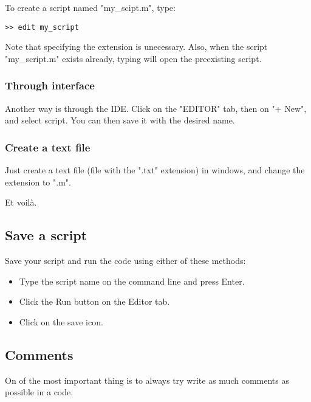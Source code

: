 			To create a script named "my\_scipt.m", type:
\begin{lstlisting}
>> edit my_script
\end{lstlisting}
			Note that specifying the extension is unecessary.
			Also, when the script "my\_script.m" exists already, typing  will open the preexisting script.		
		\subsubsection{Through \matlab interface}
			Another way is through the IDE.
			Click on the "EDITOR" tab, then on "+ New", and select script.
			You can then save it with the desired name.

		\subsubsection{Create a text file}
			Just create a text file (file with the ".txt" extension) in windows, and change the extension to ".m".

		Et voilà.

	\subsection{Save a script}
		Save your script and run the code using either of these methods:
		\begin{itemize}
			\item Type the script name on the command line and press Enter. 
			\item Click the Run button on the Editor tab.
			\item Click on the save icon.
		\end{itemize}

	\subsection{Comments}
		On of the most important thing is to always try write as much comments as possible in a code.


